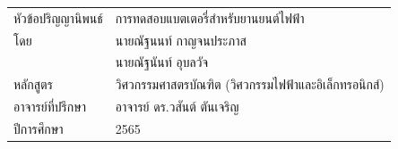 \setcounter{page}{1}
\frontmatter
\noindent\begin{tabularx}{\linewidth}{@{}l@{\qquad}X@{}}
	หัวข้อปริญญานิพนธ์								& การทดสอบแบตเตอรี่สำหรับยานยนต์ไฟฟ้า\\
	โดย										& นายณัฐนนท์ กาญจนประภาส\\ & นายณัฐนันท์ อุบลวัจ\\
	หลักสูตร									& วิศวกรรมศาสตรบัณฑิต (วิศวกรรมไฟฟ้าและอิเล็กทรอนิกส์)\\
	อาจารย์ที่ปรึกษา									& อาจารย์ ดร.วสันต์ ตันเจริญ\\
	ปีการศึกษา									& 2565
\end{tabularx}

\cleardoublepage
\newpage




